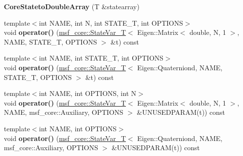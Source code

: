\begin{DoxyCompactItemize}
\item 
\hypertarget{structmsf__tmp_1_1CoreStatetoDoubleArray_a2a0945a4188991a41a3e05d45e4624d8}{{\bfseries Core\-Stateto\-Double\-Array} (T \&statearray)}\label{structmsf__tmp_1_1CoreStatetoDoubleArray_a2a0945a4188991a41a3e05d45e4624d8}

\item 
\hypertarget{structmsf__tmp_1_1CoreStatetoDoubleArray_ad2962d3a54c4d5e3dd5e61ed9d97a364}{{\footnotesize template$<$int N\-A\-M\-E, int N, int S\-T\-A\-T\-E\-\_\-\-T, int O\-P\-T\-I\-O\-N\-S$>$ }\\void {\bfseries operator()} (\hyperlink{structmsf__core_1_1StateVar__T}{msf\-\_\-core\-::\-State\-Var\-\_\-\-T}$<$ Eigen\-::\-Matrix$<$ double, N, 1 $>$, N\-A\-M\-E, S\-T\-A\-T\-E\-\_\-\-T, O\-P\-T\-I\-O\-N\-S $>$ \&t) const }\label{structmsf__tmp_1_1CoreStatetoDoubleArray_ad2962d3a54c4d5e3dd5e61ed9d97a364}

\item 
\hypertarget{structmsf__tmp_1_1CoreStatetoDoubleArray_a1e2b449cd8f4bd9da501cd6ca218c678}{{\footnotesize template$<$int N\-A\-M\-E, int S\-T\-A\-T\-E\-\_\-\-T, int O\-P\-T\-I\-O\-N\-S$>$ }\\void {\bfseries operator()} (\hyperlink{structmsf__core_1_1StateVar__T}{msf\-\_\-core\-::\-State\-Var\-\_\-\-T}$<$ Eigen\-::\-Quaterniond, N\-A\-M\-E, S\-T\-A\-T\-E\-\_\-\-T, O\-P\-T\-I\-O\-N\-S $>$ \&t) const }\label{structmsf__tmp_1_1CoreStatetoDoubleArray_a1e2b449cd8f4bd9da501cd6ca218c678}

\item 
\hypertarget{structmsf__tmp_1_1CoreStatetoDoubleArray_a45de4ca232716e6380870ce30d161478}{{\footnotesize template$<$int N\-A\-M\-E, int O\-P\-T\-I\-O\-N\-S, int N$>$ }\\void {\bfseries operator()} (\hyperlink{structmsf__core_1_1StateVar__T}{msf\-\_\-core\-::\-State\-Var\-\_\-\-T}$<$ Eigen\-::\-Matrix$<$ double, N, 1 $>$, N\-A\-M\-E, msf\-\_\-core\-::\-Auxiliary, O\-P\-T\-I\-O\-N\-S $>$ \&U\-N\-U\-S\-E\-D\-P\-A\-R\-A\-M(t)) const }\label{structmsf__tmp_1_1CoreStatetoDoubleArray_a45de4ca232716e6380870ce30d161478}

\item 
\hypertarget{structmsf__tmp_1_1CoreStatetoDoubleArray_a6433aac027f49d4cc2bfe62a8416bd70}{{\footnotesize template$<$int N\-A\-M\-E, int O\-P\-T\-I\-O\-N\-S$>$ }\\void {\bfseries operator()} (\hyperlink{structmsf__core_1_1StateVar__T}{msf\-\_\-core\-::\-State\-Var\-\_\-\-T}$<$ Eigen\-::\-Quaterniond, N\-A\-M\-E, msf\-\_\-core\-::\-Auxiliary, O\-P\-T\-I\-O\-N\-S $>$ \&U\-N\-U\-S\-E\-D\-P\-A\-R\-A\-M(t)) const }\label{structmsf__tmp_1_1CoreStatetoDoubleArray_a6433aac027f49d4cc2bfe62a8416bd70}


\end{DoxyCompactItemize}
